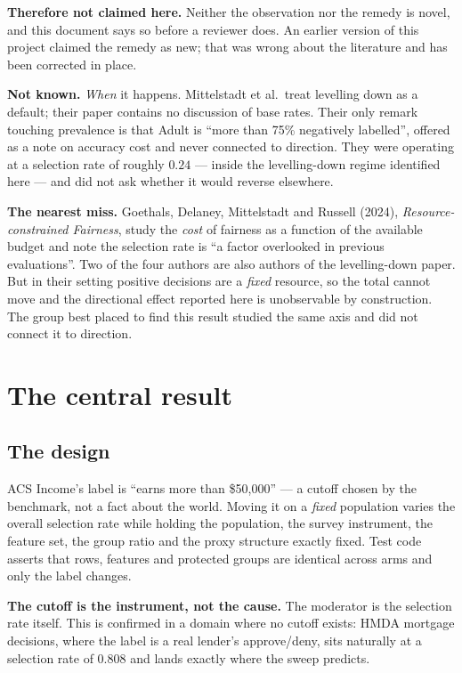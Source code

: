 \documentclass[11pt,a4paper]{article}
\newcommand{\claim}[1]{\medskip\noindent\textbf{#1}\quad}
\begin{document}
\claim{Therefore not claimed here.} Neither the observation nor the remedy is novel, and
this document says so before a reviewer does. An earlier version of this project claimed
the remedy as new; that was wrong about the literature and has been corrected in place.

\claim{Not known.} \emph{When} it happens. Mittelstadt et al.\ treat levelling down as a
default; their paper contains no discussion of base rates. Their only remark touching
prevalence is that Adult is ``more than 75\% negatively labelled'', offered as a note on
accuracy cost and never connected to direction. They were operating at a selection rate of
roughly $0.24$ --- inside the levelling-down regime identified here --- and did not ask
whether it would reverse elsewhere.

\claim{The nearest miss.} Goethals, Delaney, Mittelstadt and Russell (2024),
\emph{Resource-constrained Fairness}, study the \emph{cost} of fairness as a function of the
available budget and note the selection rate is ``a factor overlooked in previous
evaluations''. Two of the four authors are also authors of the levelling-down paper. But in
their setting positive decisions are a \emph{fixed} resource, so the total cannot move and
the directional effect reported here is unobservable by construction. The group best placed
to find this result studied the same axis and did not connect it to direction.

\section{The central result}

\subsection{The design}

ACS Income's label is ``earns more than \$50{,}000'' --- a cutoff chosen by the benchmark,
not a fact about the world. Moving it on a \emph{fixed} population varies the overall
selection rate while holding the population, the survey instrument, the feature set, the
group ratio and the proxy structure exactly fixed. Test code asserts that rows, features and
protected groups are identical across arms and only the label changes.

\textbf{The cutoff is the instrument, not the cause.} The moderator is the selection rate
itself. This is confirmed in a domain where no cutoff exists: HMDA mortgage decisions, where
the label is a real lender's approve/deny, sits naturally at a selection rate of $0.808$ and
lands exactly where the sweep predicts.
\end{document}
